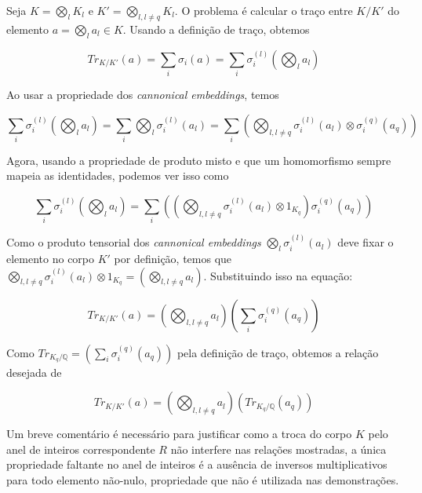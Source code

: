 Seja $K = \bigotimes_l K_l$ e $K' = \bigotimes_{l, l \neq q} K_l$. O problema é calcular o traço entre $K/K'$ do elemento $a = \bigotimes_l a_l \in K$.
Usando a definição de traço, obtemos

\begin{equation}
    Tr_{K/K'} (a) = \sum_i \sigma_i(a) = \sum_i \sigma_i^{(l)}(\bigotimes_l a_l)  
\end{equation}

Ao usar a propriedade dos \textit{cannonical embeddings}, temos 

\begin{equation}
    \sum_i \sigma_i^{(l)}(\bigotimes_l a_l) = \sum_i \bigotimes_l \sigma_i^{(l)}( a_l) =  \sum_i (\bigotimes_{l, l \neq q} \sigma_i^{(l)}(a_l) \otimes \sigma_i^{(q)}(a_q))
\end{equation}

Agora, usando a propriedade de produto misto e que um homomorfismo sempre mapeia as identidades, podemos ver isso como

\begin{equation}
    \sum_i \sigma_i^{(l)}(\bigotimes_l a_l) = \sum_i ( (\bigotimes_{l, l \neq q} \sigma_i^{(l)}(a_l) \otimes 1_{K_q}) \sigma_i^{(q)}(a_q))
\end{equation}

Como o produto tensorial dos \textit{cannonical embeddings} $\bigotimes_{l} \sigma_i^{(l)}(a_l)$ deve fixar o elemento no corpo $K'$ por definição, temos que 
$\bigotimes_{l, l \neq q} \sigma_i^{(l)}(a_l) \otimes 1_{K_q} = (\bigotimes_{l, l \neq q}a_l)$. Substituindo isso na equação:  

\begin{equation}
    Tr_{K/K'} (a) = (\bigotimes_{l, l \neq q}a_l) (\sum_i \sigma_i^{(q)}(a_q))
\end{equation}

Como $Tr_{K_q/\mathbb{Q}} = (\sum_i \sigma_i^{(q)}(a_q))$ pela definição de traço, obtemos a relação desejada de 

\begin{equation}
    \label{eq:mix_trace}
    Tr_{K/K'} (a) = (\bigotimes_{l, l \neq q}a_l) (Tr_{K_q/\mathbb{Q}} (a_q))
\end{equation}

Um breve comentário é necessário para justificar como a troca do corpo $K$ pelo anel de inteiros correspondente $R$ não interfere nas relações mostradas, a única propriedade faltante no anel de inteiros é a ausência de inversos multiplicativos para todo elemento não-nulo, propriedade que não é utilizada nas demonstrações.

